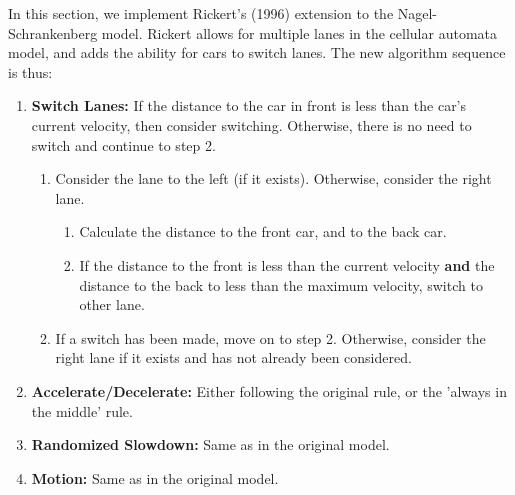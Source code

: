 \documentclass{article}
\begin{document}
In this section, we implement Rickert's (1996) extension to the Nagel-Schrankenberg model. Rickert allows for multiple lanes in the cellular automata model, and adds the ability for cars to switch lanes. The new algorithm sequence is thus: 
\begin{enumerate}
\item \textbf{Switch Lanes:} If the distance to the car in front is less than the car's current velocity, then consider switching. Otherwise, there is no need to switch and continue to step 2.
\begin{enumerate}
	\item Consider the lane to the left (if it exists). Otherwise, consider the right lane.
	\begin{enumerate}
	\item Calculate the distance to the front car, and to the back car.
	\item If the distance to the front is less than the current velocity \textbf{and} the distance to the back to less than the maximum velocity, switch to other lane.
	\end{enumerate}
	\item If a switch has been made, move on to step 2. Otherwise, consider the right lane if it exists and has not already been considered.
\end{enumerate}
\item \textbf{Accelerate/Decelerate:} Either following the original rule, or the 'always in the middle' rule.
\item \textbf{Randomized Slowdown:} Same as in the original model.
\item \textbf{Motion:} Same as in the original model. 
\end{enumerate}
\end{document}
